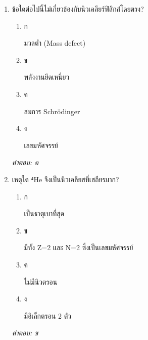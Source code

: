\documentclass[12pt]{article}
\begin{document}
\begin{enumerate}[label=\arabic*., itemsep=0.5\baselineskip, topsep=0.5\baselineskip, leftmargin=*]
\item ข้อใดต่อไปนี้ไม่เกี่ยวข้องกับนิวเคลียร์ฟิสิกส์โดยตรง?
\begin{enumerate}[label=\alph*)., itemsep=0.3\baselineskip, topsep=0.3\baselineskip]
\item ก\ 
\begin{minipage}[t]{0.9\linewidth}
\raggedright มวลต่ำ (Mass defect)
\end{minipage}
\item ข\ 
\begin{minipage}[t]{0.9\linewidth}
\raggedright พลังงานยึดเหนี่ยว
\end{minipage}
\item ค\ 
\begin{minipage}[t]{0.9\linewidth}
\raggedright สมการ Schrödinger
\end{minipage}
\item ง\ 
\begin{minipage}[t]{0.9\linewidth}
\raggedright เลขมหัศจรรย์
\end{minipage}
\end{enumerate}
\vspace{-0.3\baselineskip}
\begin{small}
\textit{คำตอบ: ค}
\end{small}

\item เหตุใด ⁴He จึงเป็นนิวเคลียสที่เสถียรมาก?
\begin{enumerate}[label=\alph*)., itemsep=0.3\baselineskip, topsep=0.3\baselineskip]
\item ก\ 
\begin{minipage}[t]{0.9\linewidth}
\raggedright เป็นธาตุเบาที่สุด
\end{minipage}
\item ข\ 
\begin{minipage}[t]{0.9\linewidth}
\raggedright มีทั้ง Z=2 และ N=2 ซึ่งเป็นเลขมหัศจรรย์
\end{minipage}
\item ค\ 
\begin{minipage}[t]{0.9\linewidth}
\raggedright ไม่มีนิวตรอน
\end{minipage}
\item ง\ 
\begin{minipage}[t]{0.9\linewidth}
\raggedright มีอิเล็กตรอน 2 ตัว
\end{minipage}
\end{enumerate}
\vspace{-0.3\baselineskip}
\begin{small}
\textit{คำตอบ: ข}
\end{small}


\end{enumerate}
\end{document}
